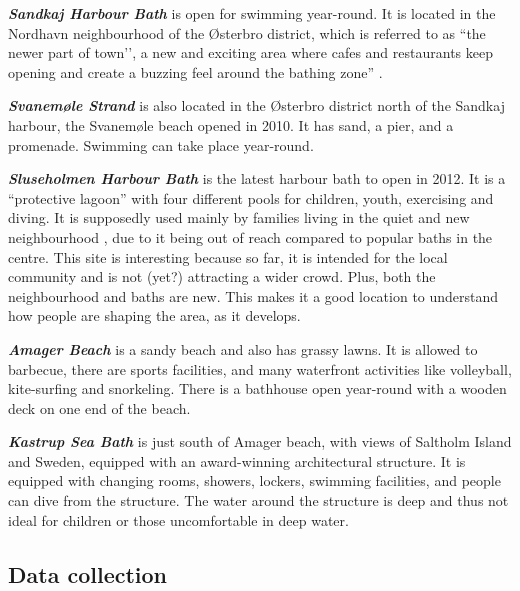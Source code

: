 \documentclass{article}
\newcommand{\bisection}[1]{\textbf{\textit{#1}}}
\begin{document}
\bisection{Sandkaj Harbour Bath} is open for swimming year-round. It is located in the Nordhavn neighbourhood of the Østerbro district, which is referred to as ``the newer part of town’’, a new and exciting area where cafes and restaurants keep opening and create a buzzing feel around the bathing zone” \parencite{visitcopenhagen_baths}.

\bisection{Svanemøle Strand} is also located in the Østerbro district north of the Sandkaj harbour, the Svanemøle beach opened in 2010. It has sand, a pier, and a promenade. Swimming can take place year-round.

\bisection{Sluseholmen Harbour Bath} is the latest harbour bath to open in 2012. It is a “protective lagoon”\parencite{visitcopenhagen_baths} with four different pools for children, youth, exercising and diving. It is supposedly used mainly by families living in the quiet and new neighbourhood \parencite{bak_2015}, due to it being out of reach compared to popular baths in the centre. This site is interesting because so far, it is intended for the local community and is not (yet?) attracting a wider crowd. Plus, both the neighbourhood and baths are new. This makes it a good location to understand how people are shaping the area, as it develops.

\bisection{Amager Beach} is a sandy beach and also has grassy lawns. It is allowed to barbecue, there are sports facilities, and many waterfront activities like volleyball, kite-surfing and snorkeling. There is a bathhouse open year-round with a wooden deck on one end of the beach.

\bisection{Kastrup Sea Bath} is just south of Amager beach, with views of Saltholm Island and Sweden, equipped with an award-winning architectural structure. It is equipped with changing rooms, showers, lockers, swimming facilities, and people can dive from the structure. The water around the structure is deep and thus not ideal for children or those uncomfortable in deep water.

\subsection{Data collection}

\end{document}

